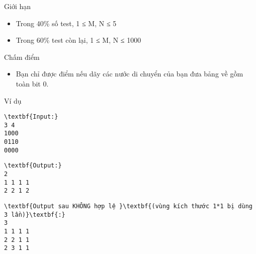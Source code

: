 Giới hạn
\begin{itemize}
	\item     Trong 40\% số test, 1 ≤ M, N ≤ 5   
	\item     Trong 60\% test còn lại, 1 ≤ M, N ≤ 1000   
\end{itemize}
Chấm điểm
\begin{itemize}
	\item     Bạn chỉ được điểm nếu dãy các nước di chuyển của bạn đưa bảng về gồm toàn bit 0.   
\end{itemize}
Ví dụ
\begin{verbatim}
\textbf{Input:}
3 4
1000
0110
0000
\end{verbatim}
\begin{verbatim}
\textbf{Output:}
2
1 1 1 1
2 2 1 2
\end{verbatim}
\begin{verbatim}
\textbf{Output sau KHÔNG hợp lệ }\textbf{(vùng kích thước 1*1 bị dùng 3 lần)}\textbf{:}
3
1 1 1 1
2 2 1 1
2 3 1 1
\end{verbatim}